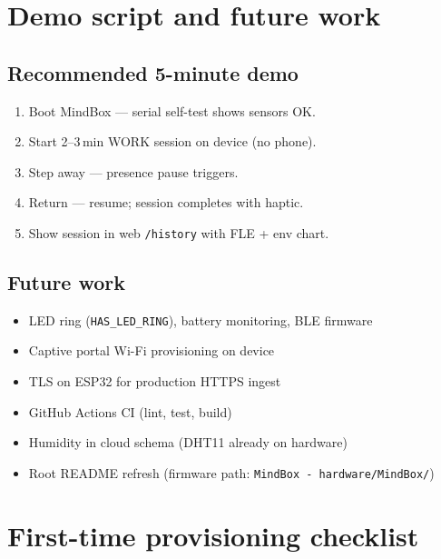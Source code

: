 \documentclass[11pt,a4paper]{report}
\newcommand{\filepath}[1]{\texttt{#1}}
\begin{document}
\chapter{Demo script and future work}

\section{Recommended 5-minute demo}

\begin{enumerate}[leftmargin=*]
  \item Boot MindBox --- serial self-test shows sensors OK.
  \item Start 2--3\,min WORK session on device (no phone).
  \item Step away --- presence pause triggers.
  \item Return --- resume; session completes with haptic.
  \item Show session in web \texttt{/history} with FLE + env chart.
\end{enumerate}

\section{Future work}

\begin{itemize}[leftmargin=*]
  \item LED ring (\texttt{HAS\_LED\_RING}), battery monitoring, BLE firmware
  \item Captive portal Wi-Fi provisioning on device
  \item TLS on ESP32 for production HTTPS ingest
  \item GitHub Actions CI (lint, test, build)
  \item Humidity in cloud schema (DHT11 already on hardware)
  \item Root README refresh (firmware path: \filepath{MindBox - hardware/MindBox/})
\end{itemize}

\appendix
\chapter{First-time provisioning checklist}
\end{document}

